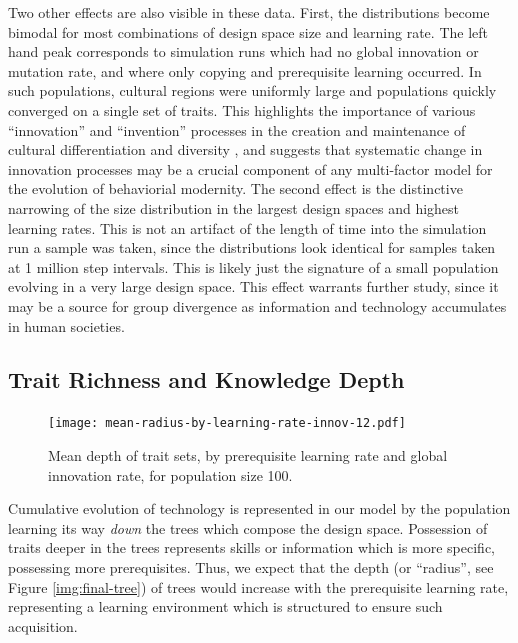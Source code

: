 \documentclass[referee,graybox,natbib]{svmult}
\begin{document}
Two other effects are also visible in these data. First, the
distributions become bimodal for most combinations of design space size
and learning rate. The left hand peak corresponds to simulation runs
which had no global innovation or mutation rate, and where only copying
and prerequisite learning occurred. In such populations, cultural
regions were uniformly large and populations quickly converged on a
single set of traits. This highlights the importance of various
``innovation'' and ``invention'' processes in the creation and
maintenance of cultural differentiation and diversity
\citep{eerkens2005cultural, o2010innovation}, and suggests that
systematic change in innovation processes may be a crucial component of
any multi-factor model for the evolution of behaviorial modernity. The
second effect is the distinctive narrowing of the size distribution in
the largest design spaces and highest learning rates. This is not an
artifact of the length of time into the simulation run a sample was
taken, since the distributions look identical for samples taken at 1
million step intervals. This is likely just the signature of a small
population evolving in a very large design space. This effect warrants
further study, since it may be a source for group divergence as
information and technology accumulates in human societies.

\subsection{Trait Richness and Knowledge
Depth}\label{trait-richness-and-knowledge-depth}

\begin{figure}[h] 
\centering 
\texttt{[image: mean-radius-by-learning-rate-innov-12.pdf]} 
\caption{Mean depth of trait sets, by prerequisite learning rate and global innovation rate, for population size 100.} 
\label{img:mean-radius-cultures-100} 
\end{figure}

Cumulative evolution of technology is represented in our model by the
population learning its way \emph{down} the trees which compose the
design space. Possession of traits deeper in the trees represents skills
or information which is more specific, possessing more prerequisites.
Thus, we expect that the depth (or ``radius'', see Figure
\ref{img:final-tree}) of trees would increase with the prerequisite
learning rate, representing a learning environment which is structured
to ensure such acquisition.
\end{document}
